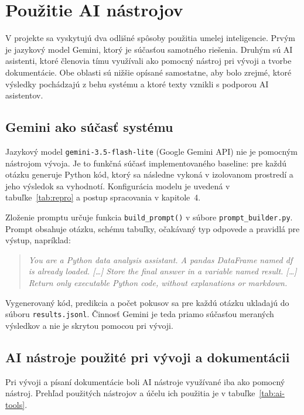 \section{Použitie AI nástrojov}

V projekte sa vyskytujú dva odlišné spôsoby použitia umelej inteligencie. Prvým je jazykový model Gemini, ktorý je súčasťou samotného riešenia. Druhým sú AI asistenti, ktoré členovia tímu využívali ako pomocný nástroj pri vývoji a tvorbe dokumentácie. Obe oblasti sú nižšie opísané samostatne, aby bolo zrejmé, ktoré výsledky pochádzajú z behu systému a ktoré texty vznikli s podporou AI asistentov.

\subsection{Gemini ako súčasť systému}

Jazykový model \texttt{gemini-3.5-flash-lite} (Google Gemini API) nie je pomocným nástrojom vývoja. Je to funkčná súčasť implementovaného baseline: pre každú otázku generuje Python kód, ktorý sa následne vykoná v izolovanom prostredí a jeho výsledok sa vyhodnotí. Konfigurácia modelu je uvedená v tabuľke~\ref{tab:repro} a postup spracovania v kapitole~4.

Zloženie promptu určuje funkcia \texttt{build\_prompt()} v súbore \texttt{prompt\_builder.py}. Prompt obsahuje otázku, schému tabuľky, očakávaný typ odpovede a pravidlá pre výstup, napríklad:

\begin{quote}
\small\itshape
You are a Python data analysis assistant. A pandas DataFrame named df is already loaded. [\ldots] Store the final answer in a variable named result. [\ldots] Return only executable Python code, without explanations or markdown.
\end{quote}

Vygenerovaný kód, predikcia a počet pokusov sa pre každú otázku ukladajú do súboru \texttt{results.jsonl}. Činnosť Gemini je teda priamo súčasťou meraných výsledkov a nie je skrytou pomocou pri vývoji.

\subsection{AI nástroje použité pri vývoji a dokumentácii}

Pri vývoji a písaní dokumentácie boli AI nástroje využívané iba ako pomocný nástroj. Prehľad použitých nástrojov a účelu ich použitia je v tabuľke~\ref{tab:ai-tools}.

